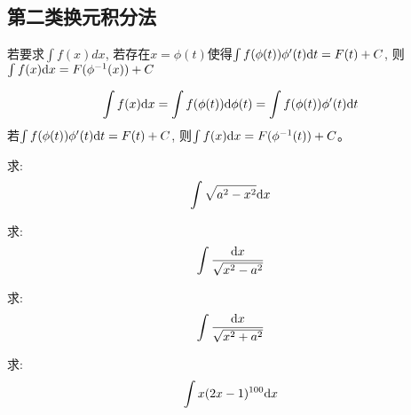\subsection{第二类换元积分法}
\begin{theorem}[第二类换元积分法]
    若要求$\int f(x) dx$, 若存在$x = \phi(t)$使得$\int f(\phi(t))\phi'(t) \mathrm{d} t = F(t) + C$, 则$\int f(x) \mathrm{d} x = F(\phi^{-1}(x)) + C$
\end{theorem}
\begin{remark}
    \begin{equation*}
        \int f(x) \mathrm{d} x = \int f(\phi(t)) \mathrm{d} \phi(t) = \int f(\phi(t)) \phi'(t) \mathrm{d} t
    \end{equation*}
    若$\int f(\phi(t)) \phi'(t) \mathrm{d} t = F(t) + C$, 则$\int f(x) \mathrm{d} x = F(\phi^{-1}(t)) + C$。
\end{remark}
\begin{example}
    求:
    \begin{equation*}
        \int \sqrt{a^2-x^2} \mathrm{d} x
    \end{equation*}
\end{example}
\begin{solution}
    
\end{solution}

\begin{example}
    求:
    \begin{equation*}
        \int \frac{\mathrm{d} x}{\sqrt{x^2-a^2}}
    \end{equation*}
\end{example}
\begin{solution}
    
\end{solution}

\begin{example}
    求:
    \begin{equation}
        \int \frac{\mathrm{d} x}{\sqrt{x^2+a^2}}
    \end{equation}
\end{example}
\begin{solution}
    
\end{solution}

\begin{example}
    求:
    \begin{equation*}
        \int x(2x-1)^{100} \mathrm{d} x
    \end{equation*}
\end{example}
\begin{solution}
    
\end{solution}

